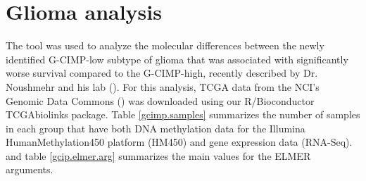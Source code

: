 
\section{Glioma analysis}

The  tool was used to analyze the molecular differences between the newly identified G-CIMP-low subtype of glioma that was associated with significantly worse survival compared to the G-CIMP-high, recently described by Dr. Noushmehr and his lab (\cite{cell}). 
For this analysis, TCGA data from the NCI's Genomic Data Commons () was downloaded using our R/Bioconductor TCGAbiolinks package. Table \ref{gcimp.samples} summarizes the number of samples in each group that have both DNA methylation data for the Illumina HumanMethylation450 platform (HM450) and gene expression data
(RNA-Seq). and table \ref{gcip.elmer.arg} summarizes the main values for the ELMER arguments.

